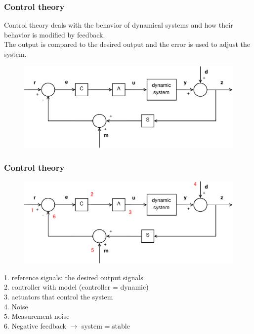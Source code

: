\documentclass{beamer}
\begin{document}
\begin{frame}
\frametitle{Control theory}
Control theory deals with the behavior of dynamical systems and how their behavior is modified by feedback.\\
The output is compared to the desired output and the error is used to adjust the system. 
\bigskip
\begin{figure}
\includegraphics[width=1\linewidth]{full_system1}
\end{figure}
\end{frame}


\begin{frame}
\vspace{-4ex}
\frametitle{Control theory}
\begin{figure}
\includegraphics[width=1\linewidth]{full_system2}
\end{figure}
\vspace{-4ex}
1. reference signals: the desired output signals\\
2. controller with model (controller = dynamic)\\
3. actuators that control the system\\
4. Noise\\
5. Measurement noise\\
6. Negative feedback $\rightarrow$ system = stable 
\end{frame}

\end{document}
